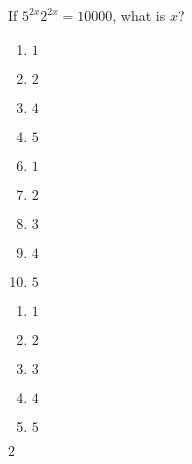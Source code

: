 

 If $5^{2x}2^{2x} = 10000$, what is $x$?\\



\ifsat
	\begin{enumerate}[label=\Alph*)]
		\item   $1$
		\item  $2$%
		\item  $4$
		\item   $5$
	\end{enumerate}
\else
\fi

\ifacteven
	\begin{enumerate}[label=\textbf{\Alph*.},itemsep=\fill,align=left]
		\setcounter{enumii}{5}
		\item   $1$
		\item  $2$%
		\item  $3$
		\addtocounter{enumii}{1}
		\item  $4$
		\item   $5$
	\end{enumerate}
\else
\fi

\ifactodd
	\begin{enumerate}[label=\textbf{\Alph*.},itemsep=\fill,align=left]
		\item   $1$
		\item  $2$%
		\item  $3$
		\item  $4$
		\item   $5$
	\end{enumerate}
\else
\fi

\ifgridin
  $2$%
		
\else
\fi


